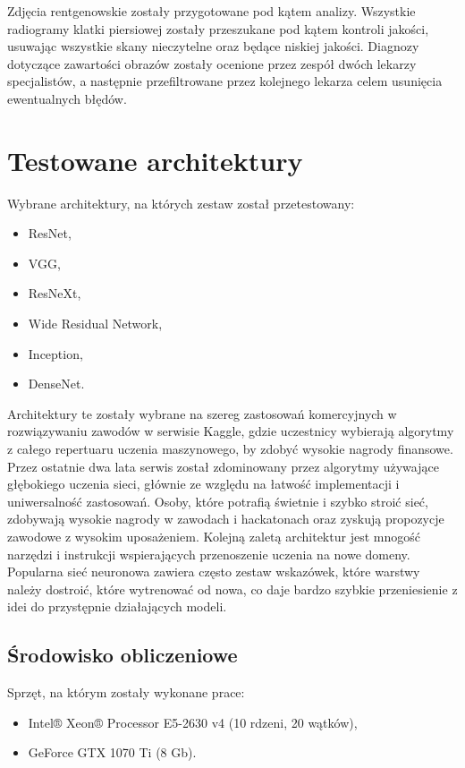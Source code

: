 \documentclass[12pt,a4paper,twoside,titlepage,openright]{book}
\begin{document}
Zdjęcia rentgenowskie zostały przygotowane pod kątem analizy. Wszystkie radiogramy klatki piersiowej zostały przeszukane pod kątem kontroli jakości, usuwając wszystkie skany nieczytelne oraz będące niskiej jakości. Diagnozy dotyczące zawartości obrazów zostały ocenione przez zespół dwóch lekarzy specjalistów, a następnie przefiltrowane przez kolejnego lekarza celem usunięcia ewentualnych błędów.

\section{Testowane architektury}
Wybrane architektury, na których zestaw został przetestowany:
\begin{itemize} 
\item ResNet,
\item VGG,
\item ResNeXt,
\item Wide Residual Network,
\item Inception,
\item DenseNet.
\end{itemize}

Architektury te zostały wybrane na szereg zastosowań komercyjnych w rozwiązywaniu zawodów w serwisie Kaggle, gdzie uczestnicy wybierają algorytmy z całego repertuaru uczenia maszynowego, by zdobyć wysokie nagrody finansowe. Przez ostatnie dwa lata serwis został zdominowany przez algorytmy używające głębokiego uczenia sieci, głównie ze względu na łatwość implementacji i uniwersalność zastosowań. Osoby, które potrafią świetnie i szybko stroić sieć, zdobywają wysokie nagrody w zawodach i hackatonach oraz zyskują propozycje zawodowe z wysokim uposażeniem. Kolejną zaletą architektur jest mnogość narzędzi i instrukcji wspierających przenoszenie uczenia na nowe domeny. Popularna sieć neuronowa zawiera często zestaw wskazówek, które warstwy należy dostroić, które wytrenować od nowa, co daje bardzo szybkie przeniesienie z idei do przystępnie działających modeli.

\subsection{Środowisko obliczeniowe}
Sprzęt, na którym zostały wykonane prace:
\begin{itemize}
\item Intel® Xeon® Processor E5-2630 v4 (10 rdzeni, 20 wątków),
\item GeForce GTX 1070 Ti (8 Gb).
\end{itemize}
\end{document}
